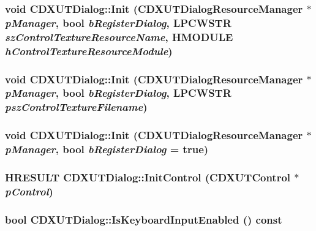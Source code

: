 \label{class_c_d_x_u_t_dialog_a6dd8c238656eb7260e0eddb8a2c1ec69}
\hypertarget{class_c_d_x_u_t_dialog_aa1de5939c452894caa2602505aa77e72}{
\subsubsection[{Init}]{\setlength{\rightskip}{0pt plus 5cm}void CDXUTDialog::Init ({\bf CDXUTDialogResourceManager} $\ast$ {\em pManager}, \/  bool {\em bRegisterDialog}, \/  LPCWSTR {\em szControlTextureResourceName}, \/  HMODULE {\em hControlTextureResourceModule})}}
\label{class_c_d_x_u_t_dialog_aa1de5939c452894caa2602505aa77e72}
\hypertarget{class_c_d_x_u_t_dialog_a50607e82b3211003dfaf0daf79aa0719}{
\subsubsection[{Init}]{\setlength{\rightskip}{0pt plus 5cm}void CDXUTDialog::Init ({\bf CDXUTDialogResourceManager} $\ast$ {\em pManager}, \/  bool {\em bRegisterDialog}, \/  LPCWSTR {\em pszControlTextureFilename})}}
\label{class_c_d_x_u_t_dialog_a50607e82b3211003dfaf0daf79aa0719}
\hypertarget{class_c_d_x_u_t_dialog_a45fcf9a802d8a9f1bce9bded09c58e22}{
\subsubsection[{Init}]{\setlength{\rightskip}{0pt plus 5cm}void CDXUTDialog::Init ({\bf CDXUTDialogResourceManager} $\ast$ {\em pManager}, \/  bool {\em bRegisterDialog} = {\ttfamily true})}}
\label{class_c_d_x_u_t_dialog_a45fcf9a802d8a9f1bce9bded09c58e22}
\hypertarget{class_c_d_x_u_t_dialog_aacf7b4a85cd752ab8aa9d676138adf86}{
\subsubsection[{InitControl}]{\setlength{\rightskip}{0pt plus 5cm}HRESULT CDXUTDialog::InitControl ({\bf CDXUTControl} $\ast$ {\em pControl})}}
\label{class_c_d_x_u_t_dialog_aacf7b4a85cd752ab8aa9d676138adf86}
\hypertarget{class_c_d_x_u_t_dialog_abfe2dae7b0eb882e25786ba20d52fc33}{
\subsubsection[{IsKeyboardInputEnabled}]{\setlength{\rightskip}{0pt plus 5cm}bool CDXUTDialog::IsKeyboardInputEnabled () const}}

